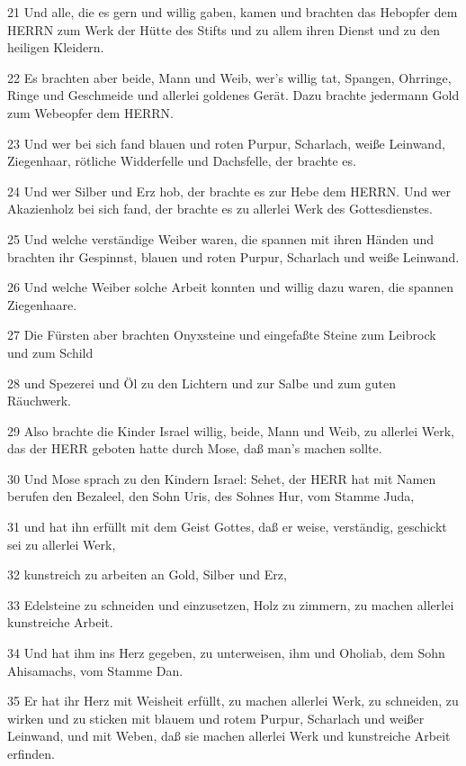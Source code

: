 \par 21 Und alle, die es gern und willig gaben, kamen und brachten das Hebopfer dem HERRN zum Werk der Hütte des Stifts und zu allem ihren Dienst und zu den heiligen Kleidern.
\par 22 Es brachten aber beide, Mann und Weib, wer's willig tat, Spangen, Ohrringe, Ringe und Geschmeide und allerlei goldenes Gerät. Dazu brachte jedermann Gold zum Webeopfer dem HERRN.
\par 23 Und wer bei sich fand blauen und roten Purpur, Scharlach, weiße Leinwand, Ziegenhaar, rötliche Widderfelle und Dachsfelle, der brachte es.
\par 24 Und wer Silber und Erz hob, der brachte es zur Hebe dem HERRN. Und wer Akazienholz bei sich fand, der brachte es zu allerlei Werk des Gottesdienstes.
\par 25 Und welche verständige Weiber waren, die spannen mit ihren Händen und brachten ihr Gespinnst, blauen und roten Purpur, Scharlach und weiße Leinwand.
\par 26 Und welche Weiber solche Arbeit konnten und willig dazu waren, die spannen Ziegenhaare.
\par 27 Die Fürsten aber brachten Onyxsteine und eingefaßte Steine zum Leibrock und zum Schild
\par 28 und Spezerei und Öl zu den Lichtern und zur Salbe und zum guten Räuchwerk.
\par 29 Also brachte die Kinder Israel willig, beide, Mann und Weib, zu allerlei Werk, das der HERR geboten hatte durch Mose, daß man's machen sollte.
\par 30 Und Mose sprach zu den Kindern Israel: Sehet, der HERR hat mit Namen berufen den Bezaleel, den Sohn Uris, des Sohnes Hur, vom Stamme Juda,
\par 31 und hat ihn erfüllt mit dem Geist Gottes, daß er weise, verständig, geschickt sei zu allerlei Werk,
\par 32 kunstreich zu arbeiten an Gold, Silber und Erz,
\par 33 Edelsteine zu schneiden und einzusetzen, Holz zu zimmern, zu machen allerlei kunstreiche Arbeit.
\par 34 Und hat ihm ins Herz gegeben, zu unterweisen, ihm und Oholiab, dem Sohn Ahisamachs, vom Stamme Dan.
\par 35 Er hat ihr Herz mit Weisheit erfüllt, zu machen allerlei Werk, zu schneiden, zu wirken und zu sticken mit blauem und rotem Purpur, Scharlach und weißer Leinwand, und mit Weben, daß sie machen allerlei Werk und kunstreiche Arbeit erfinden.

